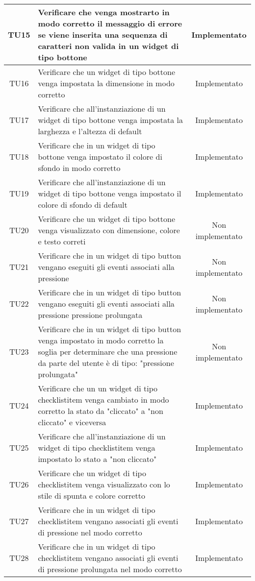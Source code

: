 \begin{center}
\begin{longtable}{|c|>{\centering}m{10cm}|c|}
		TU15 & Verificare che venga mostrarto in modo corretto il messaggio di errore se viene inserita una sequenza di caratteri non valida in un widget di tipo bottone & Implementato \\ \hline
		TU16 & Verificare che un widget di tipo bottone venga impostata la dimensione in modo corretto & Implementato \\ \hline
		TU17 & Verificare che all'instanziazione di un widget di tipo bottone venga impostata la larghezza e l'altezza di default & Implementato \\ \hline
		TU18 & Verificare che in un widget di tipo bottone venga impostato il colore di sfondo in modo corretto & Implementato \\ \hline
		TU19 & Verificare che all'instanziazione di un widget di tipo bottone venga impostato il colore di sfondo di default & Implementato \\ \hline
		TU20 & Verificare che un widget di tipo bottone venga visualizzato con dimensione, colore e testo correti & Non implementato \\ \hline
		TU21 & Verificare che in un widget di tipo button vengano eseguiti gli eventi associati alla pressione & Non implementato \\ \hline
		TU22 & Verificare che in un widget di tipo button vengano eseguiti gli eventi associati alla pressione pressione prolungata & Non implementato \\ \hline
		TU23 & Verificare che in un widget di tipo button venga impostato in modo corretto la soglia per determinare che una pressione da parte del utente è di tipo: "pressione prolungata" & Non implementato \\ \hline
		TU24 & Verificare che un un widget di tipo checklistitem venga cambiato in modo corretto la stato da "cliccato" a "non cliccato" e viceversa & Implementato \\ \hline
		TU25 & Verificare che all'instanziazione di un widget di tipo checklistitem venga impostato lo stato a "non cliccato" & Implementato \\ \hline
		TU26 & Verificare che un widget di tipo checklistitem venga visualizzato con lo stile di spunta e colore corretto & Implementato \\ \hline
		TU27 & Verificare che in un widget di tipo checklistitem vengano associati gli eventi di pressione nel modo corretto & Implementato \\ \hline
		TU28 & Verificare che in un widget di tipo checklistitem vengano associati gli eventi di pressione prolungata nel modo corretto & Implementato \\ \hline

\end{longtable}
\end{center}
